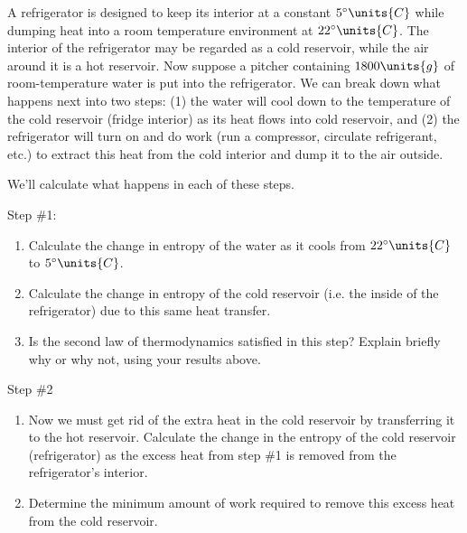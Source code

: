 \begin{problem} 
 A  refrigerator is designed to  keep its interior  at a constant
  $5^\circ\units{C}$  while  dumping  heat  into  a  room  temperature
  environment at $22^\circ\units{C}$.  The interior of
  the refrigerator may be regarded as a cold reservoir, 
while the air  around it is a
  hot reservoir.  Now suppose  a pitcher containing $1800\units{g}$ of
  room-temperature water  is put into  the refrigerator. We  can break
  down what happens next into two  steps: (1) the water will cool down
  to the  temperature of the  cold reservoir (fridge interior)  as its
  heat flows into  cold reservoir, and (2) the  refrigerator will turn
  on and do  work (run a compressor, circulate  refrigerant, etc.)  to
  extract this  heat from  the cold  interior and dump  it to  the air
  outside.

We'll calculate what happens in each of these steps.

Step \#1:
\begin{enumerate}
\item  Calculate the change in entropy of the water as it cools from 
$22^\circ\units{C}$ to $5^\circ\units{C}$.
\item Calculate the change in entropy of the cold reservoir (i.e. the
inside of the refrigerator) due to this same heat transfer.

\item Is the second law of thermodynamics satisfied in this step?
Explain briefly why or why not, using your results above.
\end{enumerate}

Step \#2
\begin{enumerate}

\item Now we must get rid of the extra heat in the cold reservoir 
  by   transferring  it  to  the  hot  reservoir.
  Calculate the change in the entropy of the cold reservoir
(refrigerator) as the excess heat
  from step \#1 is removed from the refrigerator's interior.

\item  Determine the minimum amount  of work required to remove this 
excess heat
from the cold reservoir. 


\end{enumerate}
\end{problem}


